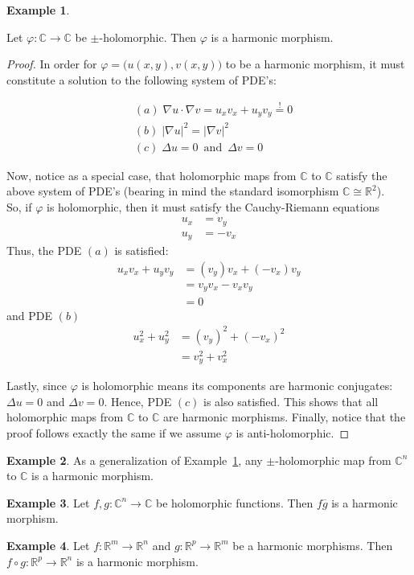 \documentclass[12pt]{article}
\theoremstyle{definition}
\newtheorem{example}{Example}[subsection]
\numberwithin{equation}{subsection}
\begin{document}
\begin{example} \label{ex: holom}

Let $\varphi: \mathbb{C} \rightarrow \mathbb{C}$ be $\pm$-holomorphic. Then $\varphi$ is a harmonic morphism.

\begin{proof} In order for $\varphi = \big(u(x,y) , v(x,y)   \big)$ to be a harmonic morphism, it must constitute a solution to the following system of PDE's:

\begin{align*}
&(a)\; \nabla u \cdot \nabla v = u_x v_x + u_y v_y \overset{!}{=} 0 \\
&(b)\; |\nabla u|^2 = |\nabla v|^2\\
&(c) \; \Delta u = 0 \enspace \text{and} \enspace \Delta v = 0
\end{align*}

Now, notice as a special case, that holomorphic maps from $\mathbb{C}$ to $\mathbb{C}$ satisfy the above system of PDE's (bearing in mind the standard isomorphism $\mathbb{C} \cong \mathbb{R}^2$).\\

So, if $\varphi$ is holomorphic, then it must satisfy the Cauchy-Riemann equations
\begin{align*}
u_x &= v_y \\
u_y &= -v_x
\end{align*}
Thus, the PDE $(a)$ is satisfied:
\begin{align*}
 u_x v_x + u_y v_y &= (v_y)v_x + (-v_x)v_y \\
&=v_y v_x - v_x v_y\\
&= 0
\end{align*}
and PDE $(b)$
\begin{align*}
u_x^2 + u_y^2 & = (v_y)^2 + (- v_x)^2 \\
&=v_y^2 + v_x^2
\end{align*}

Lastly, since $\varphi$ is holomorphic means its components are harmonic conjugates: $\Delta u = 0$ and $ \Delta v = 0$. Hence, PDE $(c)$ is also satisfied. This shows that all holomorphic maps from $\mathbb{C}$ to $\mathbb{C}$ are harmonic morphisms. Finally, notice that the proof follows exactly the same if we assume $\varphi$ is anti-holomorphic.
\end{proof}
\end{example}
\begin{example}
As a generalization of Example~\ref{ex: holom}, any $\pm$-holomorphic map from $\mathbb{C}^n$ to $\mathbb{C}$ is a harmonic morphism.
\end{example}
\begin{example}
Let $f, g: \mathbb{C}^n \rightarrow \mathbb{C}$ be holomorphic functions. Then $f \overline{g}$ is a harmonic morphism.
\end{example}
\begin{example}
Let $f:\mathbb{R}^m \rightarrow \mathbb{R}^n$ and $g:\mathbb{R}^p \rightarrow \mathbb{R}^m$ be a harmonic morphisms. Then $f \circ g: \mathbb{R}^p \rightarrow \mathbb{R}^n$ is a harmonic morphism. 
\end{example}
\end{document}
